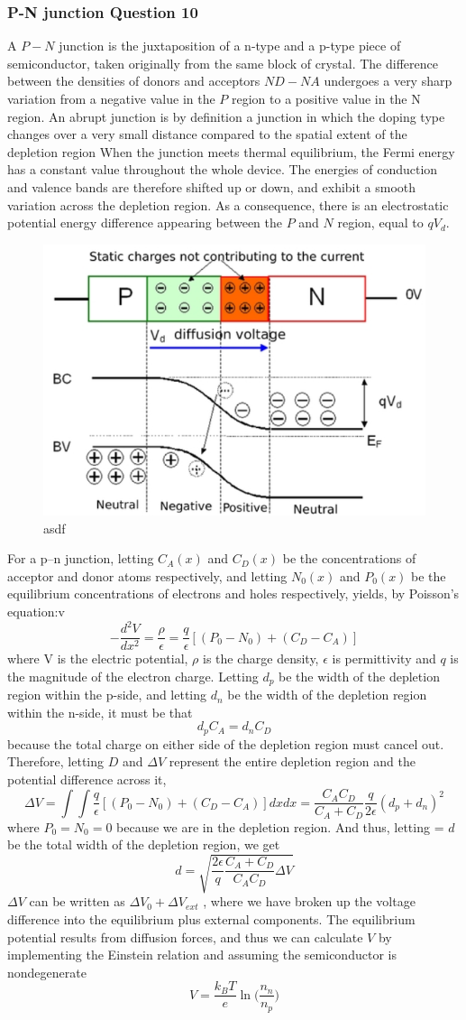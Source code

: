 \subsubsection*{P-N junction Question 10}

A $P-N$ junction is the juxtaposition of a n-type and a p-type piece of semiconductor, taken originally from the same block of crystal. The difference between the densities of donors and acceptors $ND - NA$ undergoes a very sharp variation from a negative value in the $P$ region to a positive value in the N region. An abrupt junction is by definition a junction in which the doping type changes over a very small distance compared to the spatial extent of the depletion region
When the junction meets thermal equilibrium, the Fermi energy has a constant value throughout the whole device. The energies of conduction and valence bands are therefore shifted up or down, and exhibit a smooth variation across the depletion region. As a consequence, there is an electrostatic potential energy difference appearing between the $P$ and $N$ region, equal to $qV_d$.

\begin{figure}[H]
  \centering
  \includegraphics[width=0.35\linewidth]{Graphics/Chapter3/PNjunction.PNG}
  \caption{asdf}
  \label{fig:PNjunction}
\end{figure}

For a p–n junction, letting  $C_A(x)$ and $C_D(x)$ be the concentrations of acceptor and donor atoms respectively, and letting  $N_0(x)$ and $P_0(x)$ be the equilibrium concentrations of electrons and holes respectively, yields, by Poisson's equation:v
$$
-\frac{d^2V}{dx^2} = \frac{\rho}{\epsilon} = \frac{q}{\epsilon}[(P_0 - N_0) + (C_D - C_A)]
$$
where V is the electric potential, $\rho$ is the charge density, $\epsilon$ is permittivity and $q$ is the magnitude of the electron charge. Letting $d_p$  be the width of the depletion region within the p-side, and letting $d_n$ be the width of the depletion region within the n-side, it must be that
$$
d_pC_A = d_nC_D
$$
because the total charge on either side of the depletion region must cancel out. Therefore, letting $D$ and $\Delta V$ represent the entire depletion region and the potential difference across it,
$$
\Delta V = \int \int \frac{q}{\epsilon}[(P_0 - N_0) + (C_D - C_A)] dxdx = \frac{C_AC_D}{C_A + C_D} \frac{q}{2\epsilon} (d_p + d_n)^2
$$
where $P_0 = N_0 = 0$ because we are in the depletion region. And thus, letting = $d$ be the total width of the depletion region, we get
$$
d = \sqrt{\frac{2 \epsilon}{q} \frac{C_A + C_D}{C_AC_D} \Delta V}
$$
$\Delta V$ can be written as $\Delta V_0 + \Delta V_{ext}$ , where we have broken up the voltage difference into the equilibrium plus external components. The equilibrium potential results from diffusion forces, and thus we can calculate $V$  by implementing the Einstein relation and assuming the semiconductor is nondegenerate
$$
V = \frac{k_B T}{e} \ln\bigg(\frac{n_n}{n_p}\bigg)
$$
